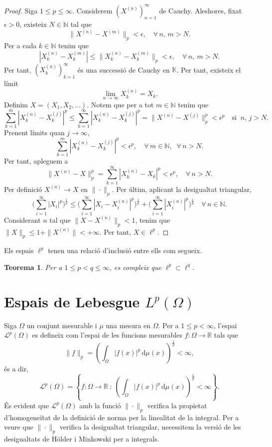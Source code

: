 \documentclass[12pt]{book}
\newtheorem{teorema}{Teorema}[chapter]
\theoremstyle{definition}
\theoremstyle{nota}
\theoremstyle{exemple}
\begin{document}
\begin{proof}
  Siga $1 \leq p \leq \infty$. Considerem $(X^{(n)})_{n=1}^\infty$ de
  Cauchy. Aleshores, fixat $\epsilon > 0$, existeix $N \in \mathbb{N}$
  tal que
  \[
    \|X^{(n)}-X^{(m)}\|_p < \epsilon, \quad \forall\,n,\,m > N.
  \]
  Per a cada $k \in \mathbb{N}$ tenim que
  \[
    |X_k^{(n)}-X_k^{(m)}| \leq \|X_k^{(n)}-X_k^{(m)}\|_p < \epsilon,
    \quad \forall\,n,\ m > N.
  \]
  Per tant, $(X_k^{(n)})_{k=1}^\infty$ és una successió de Cauchy en
  $\mathbb{K}$. Per tant, existeix el límit
  \[
    \lim_{n\to\infty} X_k^{(n)} = X_k.
  \]
  Definim $X = (X_1, X_2, \dotsc)$. Notem que per a tot
  $m \in \mathbb{N}$ tenim que
  \[
    \sum_{k=1}^m |X_k^{(n)}-X_k^{(j)}|^p \leq
    \sum_{k=1}^{\infty}|X_k^{(n)} - X_k^{(j)}|^p = \|X^{(n)} -
    X^{(j)}\|_p^p < \epsilon^p \quad \text{si} \;\; n,\,j > N.
  \]
  Prenent límits quan $j \to \infty$,
  \[
    \sum_{k=1}^{m}|X_k^{(n)} - X_k^{(j)}|^p < \epsilon^p, \quad
    \forall\,m \in \mathbb{N},\;\; \forall\,n > N.
  \]
  Per tant, apleguem a
  \[
    \|X^{(n)}-X\|_p^p = \sum_{k=1}^{\infty} |X_k^{(n)}-X_k|^p <
    \epsilon^p, \quad \forall \, n > N.
  \]
  Per definició $X^{(n)} \to X$ en $\|\cdot\|_p$. Per últim, aplicant
  la desigualtat triangular,
  \[
    \Big( \sum_{i=1}^\infty |X_i|^p \Big)^{\frac{1}{p}} \leq
    \Big( \sum_{i=1}^\infty |X_i - X_i^{(n)}|^p \Big)^{\frac{1}{p}} +
    \Big( \sum_{i=1}^\infty |X_i^{(n)}|^p \Big)^{\frac{1}{p}}
    \quad \forall \, n \in \mathbb{N}.
  \]
  Considerant $n$ tal que $\|X-X^{(n)}\|_p < 1$, tenim que
  $\|X\|_p \leq 1 + \|X^{(n)}\| < +\infty$. Per tant, $X \in \ell^p$.
\end{proof}

Els espais $\ell^p$ tenen una relació d'inclusió entre ells com
segueix.

\begin{teorema}
  Per a $1 \leq p < q \leq \infty$, es compleix que
  $\ell^p \subset \ell^q$.
\end{teorema}

\section{Espais de Lebesgue \texorpdfstring{$L^p(\Omega)$}{Lp}}

Siga $\Omega$ un conjunt mesurable i $\mu$ una mesura en $\Omega$. Per
a $1 \leq p < \infty$, l'espai $\mathcal{L}^p(\Omega)$ es defineix com
l'espai de les funcions mesurables $f : \Omega \to \mathbb{R}$ tals
que
\[
  \|f\|_p = \left( \int_\Omega |f(x)|^p \, \mathrm{d}\mu(x)
  \right)^{\frac{1}{p}} < \infty,
\]
és a dir,
\[
  \mathcal{L}^p(\Omega) = \left\{ f : \Omega \to \mathbb{R}\ :\ \left(
      \int_\Omega |f(x)|^p \, \mathrm{d}\mu(x) \right)^{\frac{1}{p}} <
    \infty \right\}.
\]
És evident que $\mathcal{L}^p(\Omega)$ amb la funció $\|\cdot\|_p$
verifica la propietat d'homogeneïtat de la definició de norma per la
linealitat de la integral. Per a veure que $\|\cdot\|_p$ verifica la
desigualtat triangular, necessitem la versió de les desigualtats de
Hölder i Minkowski per a integrals.
\end{document}
